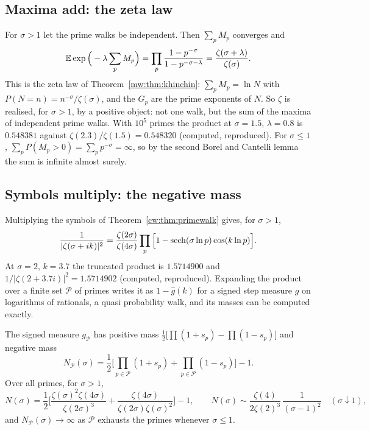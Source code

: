 \subsection{Maxima add: the zeta law}
For $\sigma>1$ let the prime walks be independent. Then $\sum_pM_p$ converges and
\[
\mathbb{E}\exp\Big(-\lambda\sum_pM_p\Big)=\prod_p\frac{1-p^{-\sigma}}{1-p^{-\sigma-\lambda}}=\frac{\zeta(\sigma+\lambda)}{\zeta(\sigma)} .
\]
This is the zeta law of Theorem~\ref{mw:thm:khinchin}: $\sum_pM_p=\ln N$ with $P(N=n)=n^{-\sigma}/\zeta(\sigma)$, and the $G_p$ are the prime exponents of $N$. So $\zeta$ is realised, for $\sigma>1$, by a positive object: not one walk, but the sum of the maxima of independent prime walks. With $10^5$ primes the product at $\sigma=1.5$, $\lambda=0.8$ is $0.548381$ against $\zeta(2.3)/\zeta(1.5)=0.548320$ (computed, reproduced). For $\sigma\le1$, $\sum_pP(M_p>0)=\sum_pp^{-\sigma}=\infty$, so by the second Borel and Cantelli lemma the sum is infinite almost surely.

\subsection{Symbols multiply: the negative mass}
Multiplying the symbols of Theorem~\ref{cw:thm:primewalk} gives, for $\sigma>1$,
\begin{equation}\label{cw:eq:walkproduct}
\frac{1}{|\zeta(\sigma+ik)|^2}=\frac{\zeta(2\sigma)}{\zeta(4\sigma)}\prod_p\Big[1-\operatorname{sech}(\sigma\ln p)\cos(k\ln p)\Big].
\end{equation}
At $\sigma=2$, $k=3.7$ the truncated product is $1.5714900$ and $1/|\zeta(2+3.7i)|^2=1.5714902$ (computed, reproduced). Expanding the product over a finite set $\mathcal P$ of primes writes it as $1-\hat g(k)$ for a signed step measure $g$ on logarithms of rationals, a quasi probability walk, and its masses can be computed exactly.

\begin{theorem}[proved]\label{cw:thm:negmass}
The signed measure $g_{\mathcal P}$ has positive mass $\frac12\big[\prod(1+s_p)-\prod(1-s_p)\big]$ and negative mass
\[
N_{\mathcal P}(\sigma)=\frac12\Big[\prod_{p\in\mathcal P}(1+s_p)+\prod_{p\in\mathcal P}(1-s_p)\Big]-1 .
\]
Over all primes, for $\sigma>1$,
\[
N(\sigma)=\frac12\Big[\frac{\zeta(\sigma)^2\zeta(4\sigma)}{\zeta(2\sigma)^3}+\frac{\zeta(4\sigma)}{\zeta(2\sigma)\zeta(\sigma)^2}\Big]-1,
\qquad
N(\sigma)\sim\frac{\zeta(4)}{2\zeta(2)^3}\,\frac{1}{(\sigma-1)^2}\quad(\sigma\downarrow1),
\]
and $N_{\mathcal P}(\sigma)\to\infty$ as $\mathcal P$ exhausts the primes whenever $\sigma\le1$.
\end{theorem}

